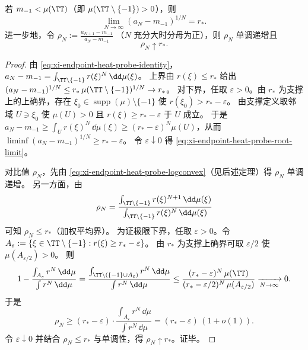 \begin{theorem}[指数根与比值极限决定谱隙半径]\label{thm:xi-endpoint-heat-probe-rstar-root-ratio}
若 \(m_{-1}<\mu(\TT)\)（即 \(\mu(\TT\setminus\{-1\})>0\)），则
\begin{equation}\label{eq:xi-endpoint-heat-probe-root-limit}
\boxed{\;\lim_{N\to\infty}(a_N-m_{-1})^{1/N}=r_\ast.\;}
\end{equation}
进一步地，令
\(
\rho_N:=\frac{a_{N+1}-m_{-1}}{a_N-m_{-1}}
\)
（\(N\) 充分大时分母为正），则 \(\rho_N\) 单调递增且
\begin{equation}\label{eq:xi-endpoint-heat-probe-ratio-limit}
\boxed{\;\rho_N\uparrow r_\ast.\;}
\end{equation}
\end{theorem}
\begin{proof}
由 \eqref{eq:xi-endpoint-heat-probe-identity}，
\(
a_N-m_{-1}=\int_{\TT\setminus\{-1\}} r(\xi)^N\,\dd\mu(\xi)
\)。
上界由 \(r(\xi)\le r_\ast\) 给出
\(
(a_N-m_{-1})^{1/N}\le r_\ast\,\mu(\TT\setminus\{-1\})^{1/N}\to r_\ast
\)。
对下界，任取 \(\varepsilon>0\)。由 \(r_\ast\) 为支撑上的上确界，存在 \(\xi_0\in\operatorname{supp}(\mu)\setminus\{-1\}\) 使 \(r(\xi_0)>r_\ast-\varepsilon\)。
由支撑定义取邻域 \(U\ni\xi_0\) 使 \(\mu(U)>0\) 且 \(r(\xi)\ge r_\ast-\varepsilon\) 于 \(U\) 成立。
于是
\(
a_N-m_{-1}\ge \int_U r(\xi)^N\,\dd\mu(\xi)\ge (r_\ast-\varepsilon)^N\mu(U)
\)，从而 \(\liminf (a_N-m_{-1})^{1/N}\ge r_\ast-\varepsilon\)。
令 \(\varepsilon\downarrow 0\) 得 \eqref{eq:xi-endpoint-heat-probe-root-limit}。
\par
对比值 \(\rho_N\)，先由 \eqref{eq:xi-endpoint-heat-probe-logconvex}（见后述定理）得 \(\rho_N\) 单调递增。
另一方面，由
\[
\rho_N=\frac{\int_{\TT\setminus\{-1\}} r(\xi)^{N+1}\,\dd\mu(\xi)}{\int_{\TT\setminus\{-1\}} r(\xi)^{N}\,\dd\mu(\xi)}
\]
可知 \(\rho_N\le r_\ast\)（加权平均界）。
为证极限下界，任取 \(\varepsilon>0\)。令 \(A_{\varepsilon}:=\{\xi\in\TT\setminus\{-1\}: r(\xi)\ge r_\ast-\varepsilon\}\)。
由 \(r_\ast\) 为支撑上确界可取 \(\varepsilon/2\) 使 \(\mu(A_{\varepsilon/2})>0\)。
则
\[
1-\frac{\int_{A_{\varepsilon}} r^N\,\dd\mu}{\int r^N\,\dd\mu}
=\frac{\int_{\TT\setminus(\{-1\}\cup A_{\varepsilon})} r^N\,\dd\mu}{\int r^N\,\dd\mu}
\le
\frac{(r_\ast-\varepsilon)^N\,\mu(\TT)}{(r_\ast-\varepsilon/2)^N\,\mu(A_{\varepsilon/2})}\xrightarrow[N\to\infty]{}0.
\]
于是
\[
\rho_N\ge (r_\ast-\varepsilon)\cdot \frac{\int_{A_{\varepsilon}} r^N\,\dd\mu}{\int r^N\,\dd\mu}=(r_\ast-\varepsilon)\,(1+o(1)).
\]
令 \(\varepsilon\downarrow 0\) 并结合 \(\rho_N\le r_\ast\) 与单调性，得 \(\rho_N\uparrow r_\ast\)。证毕。
\end{proof}


